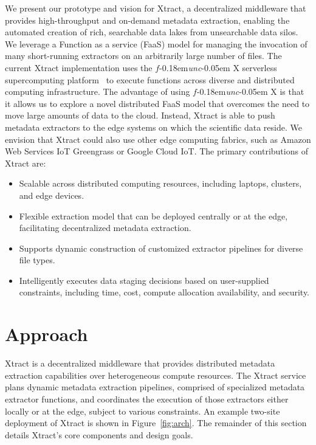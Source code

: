 \documentclass[sigconf, 9pt]{acmart}
\newcommand{\name}{Xtract}
\newcommand{\funcx}{$f$\kern-0.18em\emph{unc}\kern-0.05em X}
\begin{document}
We present our prototype and vision for \name{},
a decentralized middleware that provides high-throughput and on-demand metadata 
extraction, enabling the automated creation of rich, searchable data lakes from unsearchable data silos. 
We leverage a Function as a service (FaaS) model for managing the invocation of
many short-running extractors on an arbitrarily large number of files. 
The current \name{} implementation uses the \funcx{} serverless supercomputing platform~\cite{chard2019serverless}
to execute functions across diverse and distributed computing infrastructure.  
The advantage of using \funcx{} is that it allows us to explore a novel distributed FaaS model 
that overcomes the need to move large amounts of data to the cloud. 
Instead, \name{} is able to push
metadata extractors to the edge systems on which the scientific data reside. 
We envision that \name{} could also use other edge computing fabrics, 
such as Amazon Web Services IoT Greengrass or Google Cloud IoT. 
The primary contributions of \name{} are: 
\begin{itemize}
\item Scalable across distributed computing resources, including laptops, clusters, and edge devices.
\item Flexible extraction model that can be deployed centrally or at the edge, facilitating decentralized metadata extraction.
\item Supports dynamic construction of customized extractor pipelines for diverse file types. 
\item Intelligently executes data staging decisions based on user-supplied constraints, including time, cost, compute allocation availability, and security. 
\end{itemize}


\section{Approach}
\label{sec:approach}

\name{} is a decentralized middleware that provides distributed metadata extraction capabilities
over heterogeneous compute resources. 
The \name{} service plans dynamic metadata extraction pipelines, comprised of specialized
metadata extractor functions, and coordinates the execution of those extractors
either locally or at the edge, subject to various constraints. 
An example two-site deployment of \name{} is shown in Figure~\ref{fig:arch}. 
The remainder of this section 
details \name{}'s core components and design goals.
\end{document}
